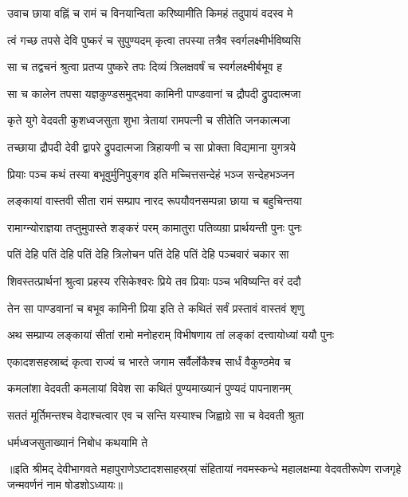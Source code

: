 \twolineshloka
{उवाच छाया वह्निं च रामं च विनयान्विता}
{करिष्यामीति किमहं तदुपायं वदस्व मे} %


\twolineshloka
{त्वं गच्छ तपसे देवि पुष्करं च सुपुण्यदम्}
{कृत्वा तपस्या तत्रैव स्वर्गलक्ष्मीर्भविष्यसि} %

\twolineshloka
{सा च तद्वचनं श्रुत्वा प्रतप्य पुष्करे तपः}
{दिव्यं त्रिलक्षवर्षं च स्वर्गलक्ष्मीर्बभूव ह} %

\twolineshloka
{सा च कालेन तपसा यज्ञकुण्डसमुद्‍भवा}
{कामिनी पाण्डवानां च द्रौपदी द्रुपदात्मजा} %

\twolineshloka
{कृते युगे वेदवती कुशध्वजसुता शुभा}
{त्रेतायां रामपत्‍नी च सीतेति जनकात्मजा} %

\twolineshloka
{तच्छाया द्रौपदी देवी द्वापरे द्रुपदात्मजा}
{त्रिहायणी च सा प्रोक्ता विद्यमाना युगत्रये} %


\twolineshloka
{प्रियाः पञ्च कथं तस्या बभूवुर्मुनिपुङ्‌गव}
{इति मच्चित्तसन्देहं भञ्ज सन्देहभञ्जन} %



\twolineshloka
{लङ्‌कायां वास्तवी सीता रामं सम्प्राप नारद}
{रूपयौवनसम्पन्ना छाया च बहुचिन्तया} %

\twolineshloka
{रामाग्न्योराज्ञया तप्तुमुपास्ते शङ्‌करं परम्}
{कामातुरा पतिव्यग्रा प्रार्थयन्ती पुनः पुनः} %

\twolineshloka
{पतिं देहि पतिं देहि पतिं देहि त्रिलोचन}
{पतिं देहि पतिं देहि पञ्चवारं चकार सा} %

\twolineshloka
{शिवस्तत्प्रार्थनां श्रुत्वा प्रहस्य रसिकेश्वरः}
{प्रिये तव प्रियाः पञ्च भविष्यन्ति वरं ददौ} %

\twolineshloka
{तेन सा पाण्डवानां च बभूव कामिनी प्रिया}
{इति ते कथितं सर्वं प्रस्तावं वास्तवं शृणु} %

\twolineshloka
{अथ सम्प्राप्य लङ्‌कायां सीतां रामो मनोहराम्}
{विभीषणाय तां लङ्‌कां दत्त्वायोध्यां ययौ पुनः} %

\twolineshloka
{एकादशसहस्राब्दं कृत्वा राज्यं च भारते}
{जगाम सर्वैर्लोकैश्च सार्धं वैकुण्ठमेव च} %

\twolineshloka
{कमलांशा वेदवती कमलायां विवेश सा}
{कथितं पुण्यमाख्यानं पुण्यदं पापनाशनम्} %

\twolineshloka
{सततं मूर्तिमन्तश्च वेदाश्चत्वार एव च}
{सन्ति यस्याश्च जिह्वाग्रे सा च वेदवती श्रुता} %

\onelineshloka
{धर्मध्वजसुताख्यानं निबोध कथयामि ते}%

॥इति श्रीमद् देवीभागवते महापुराणेऽष्टादशसाहस्र्यां संहितायां नवमस्कन्धे महालक्षम्या वेदवतीरूपेण राजगृहे जन्मवर्णनं नाम षोडशोऽध्यायः॥

\closesection